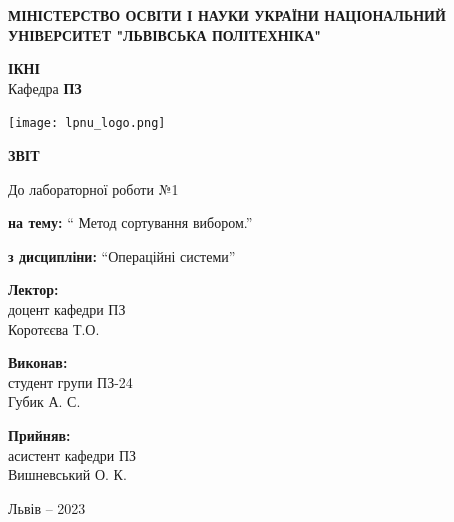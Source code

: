 \documentclass[12pt]{extarticle}
\begin{document}
\begin{titlepage}
    \begin{center}
        \textbf{\normalsize{\MakeUppercase{
            Міністерство Освіти і науки України
            Національний університет "Львівська політехніка"
        }}}

        \begin{flushright}
        \textbf{ІКНІ}\\
        Кафедра \textbf{ПЗ}
        \end{flushright}
        \vspace{15mm}

        \texttt{[image: lpnu\_logo.png]}

        \vspace*{\fill}

        \textbf{\normalsize{\MakeUppercase{Звіт}}}
            
        До лабораторної роботи №1

        \textbf{на тему:} “ Метод сортування вибором.”

        \textbf{з дисципліни:} “Операційні системи”
            
        \vspace*{\fill}

        \begin{flushright}

            \textbf{Лектор:}\\
            доцент кафедри ПЗ\\
            Коротєєва Т.О.\\
            \vspace{12pt}

            \textbf{Виконав:}\\
            студент групи ПЗ-24\\
            Губик А. С.\\
            \vspace{12pt}

            \textbf{Прийняв:}\\
            асистент кафедри ПЗ\\
            Вишневський О. К.\\
        \vspace{12pt}
        \end{flushright}

        Львів -- 2023
            
            
    \end{center}
\end{titlepage}
\end{document}
